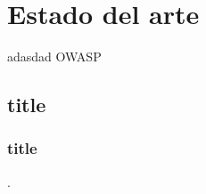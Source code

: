 \chapter{Estado del arte}
\lipsum[1-2]
adasdad \ac{OWASP}

\section{title}
\lipsum[1-3]
\subsection{title}
\lipsum[1] \cite{ISO27005}\cite{NISTGaithersburg2012}.

